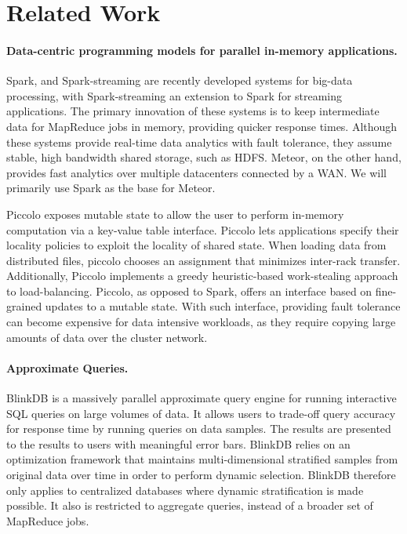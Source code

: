 \section{Related Work}

\paragraph{Data-centric programming models for parallel in-memory applications.}
Spark, and Spark-streaming \cite{spark} are recently developed systems for big-data processing, with Spark-streaming an extension to Spark for streaming applications. The primary innovation of these systems is to keep intermediate data for MapReduce jobs in memory, providing quicker response times. Although these systems provide real-time data analytics with fault tolerance, they assume stable, high bandwidth shared storage, such as HDFS. Meteor, on the other hand, provides fast analytics over multiple datacenters connected by a WAN. We will primarily use Spark as the base for Meteor.  

Piccolo \cite{piccolo} exposes mutable state to allow the user to perform in-memory computation via a key-value table interface. Piccolo lets applications specify their locality policies to exploit the locality of shared state. When loading data from distributed files, piccolo chooses an assignment that minimizes inter-rack transfer. Additionally, Piccolo implements a greedy heuristic-based work-stealing approach to load-balancing. Piccolo, as opposed to Spark, offers an interface based on fine-grained updates to a mutable state. With such interface, providing fault tolerance can become expensive for data intensive workloads, as they require copying large amounts of data over the cluster network. 

\paragraph{Approximate Queries.}
BlinkDB \cite{blinkdb} is a massively parallel approximate query engine for running interactive SQL queries on large volumes of data. It allows users to trade-off query accuracy for response time by running queries on data samples. The results are presented to the results to users with meaningful error bars. BlinkDB relies on an optimization framework that maintains multi-dimensional stratified samples from original data over time in order to perform dynamic selection. BlinkDB therefore only applies to centralized databases where dynamic stratification is made possible. It also is restricted to aggregate queries, instead of a broader set of MapReduce jobs.

